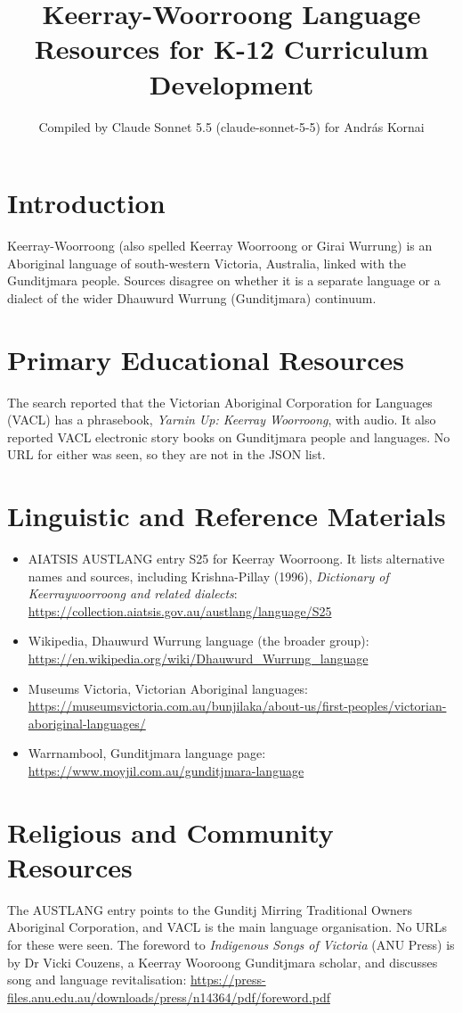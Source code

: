 \documentclass[12pt]{article}
\title{Keerray-Woorroong Language Resources for K-12 Curriculum Development}
\author{Compiled by Claude Sonnet 5.5 (claude-sonnet-5-5) for Andr\'as Kornai}
\date{}
\begin{document}
\maketitle

\section{Introduction}
Keerray-Woorroong (also spelled Keerray Woorroong or Girai Wurrung) is an Aboriginal language of south-western Victoria, Australia, linked with the Gunditjmara people. Sources disagree on whether it is a separate language or a dialect of the wider Dhauwurd Wurrung (Gunditjmara) continuum.

\section{Primary Educational Resources}
The search reported that the Victorian Aboriginal Corporation for Languages (VACL) has a phrasebook, \emph{Yarnin Up: Keerray Woorroong}, with audio. It also reported VACL electronic story books on Gunditjmara people and languages. No URL for either was seen, so they are not in the JSON list.

\section{Linguistic and Reference Materials}
\begin{itemize}
\item AIATSIS AUSTLANG entry S25 for Keerray Woorroong. It lists alternative names and sources, including Krishna-Pillay (1996), \emph{Dictionary of Keerraywoorroong and related dialects}: \url{https://collection.aiatsis.gov.au/austlang/language/S25}
\item Wikipedia, Dhauwurd Wurrung language (the broader group): \url{https://en.wikipedia.org/wiki/Dhauwurd_Wurrung_language}
\item Museums Victoria, Victorian Aboriginal languages: \url{https://museumsvictoria.com.au/bunjilaka/about-us/first-peoples/victorian-aboriginal-languages/}
\item Warrnambool, Gunditjmara language page: \url{https://www.moyjil.com.au/gunditjmara-language}
\end{itemize}

\section{Religious and Community Resources}
The AUSTLANG entry points to the Gunditj Mirring Traditional Owners Aboriginal Corporation, and VACL is the main language organisation. No URLs for these were seen. The foreword to \emph{Indigenous Songs of Victoria} (ANU Press) is by Dr Vicki Couzens, a Keerray Wooroong Gunditjmara scholar, and discusses song and language revitalisation: \url{https://press-files.anu.edu.au/downloads/press/n14364/pdf/foreword.pdf}
\end{document}
